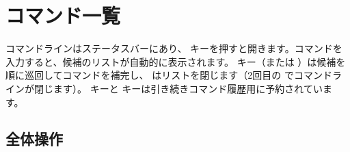 \documentclass[letterpaper,10pt,dvipdfmx]{sphinxmanual}
\begin{document}
\sphinxstepscope


\section{コマンド一覧}
\label{\detokenize{cmd_mode:liste-des-commandes}}\label{\detokenize{cmd_mode:cmd-mode}}\label{\detokenize{cmd_mode::doc}}
\sphinxAtStartPar
コマンドラインはステータスバーにあり、  キーを押すと開きます。コマンドを入力すると、候補のリストが自動的に表示されます。  キー（または  ）は候補を順に巡回してコマンドを補完し、  はリストを閉じます（2回目の  でコマンドラインが閉じます）。  キーと  キーは引き続きコマンド履歴用に予約されています。


\subsection{全体操作}
\label{\detokenize{cmd_mode:operations-globales}}\label{\detokenize{cmd_mode:cmd-global}}
\end{document}
